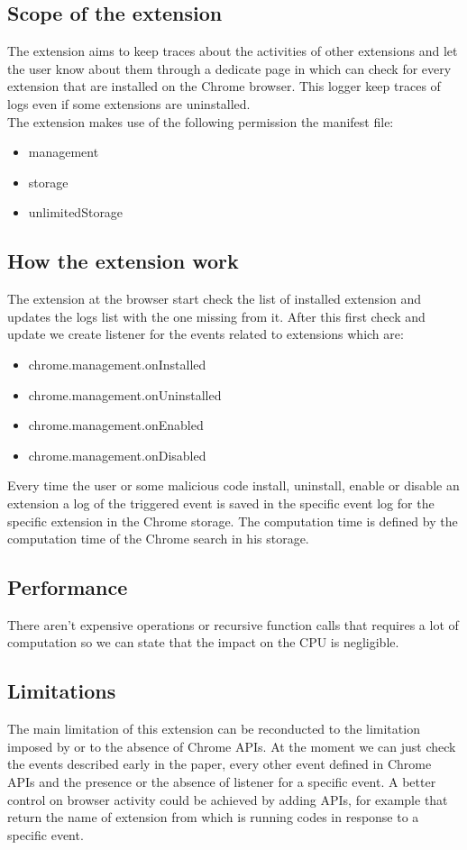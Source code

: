 \documentclass[12pt]{article}
\begin{document}
\begin{multicols}{2}
\subsection*{Scope of the extension}
The extension aims to keep traces about the activities of other extensions and let the user know
about them through a dedicate page in which can check for every extension that are installed on the
Chrome browser. This logger keep traces of logs even if some extensions are uninstalled. \\
The extension makes use of the following permission the manifest file:
\begin{itemize}
	\item  management
	\item  storage
	\item  unlimitedStorage
\end{itemize}
\subsection*{How the extension work}
The extension at the browser start check the list of installed extension and updates the logs list with the one missing from it.
After this first check and update we create listener for the events related to extensions which are: 
\begin{itemize}
	\item  chrome.management.onInstalled
	\item  chrome.management.onUninstalled
	\item  chrome.management.onEnabled
	\item  chrome.management.onDisabled
\end{itemize}
Every time the user or some malicious code install, uninstall, enable or disable an extension a log of the triggered event is saved in the specific event log for the specific extension in the Chrome storage.
The computation time is defined by the computation time of the Chrome search in his storage.
\subsection*{Performance}
There aren't expensive operations or recursive function calls that requires a lot of computation so we can state that the impact on the CPU is negligible.
\subsection*{Limitations}
The main limitation of this extension can be reconducted to the limitation imposed by or to the absence of Chrome APIs.
At the moment we can just check the events described early in the paper, every other event defined in Chrome APIs and the presence or the absence of listener for a specific event.
A better control on browser activity could be achieved by adding APIs, for example that return the name of extension from which is running codes in response to a specific event.

\end{multicols}
\end{document}
